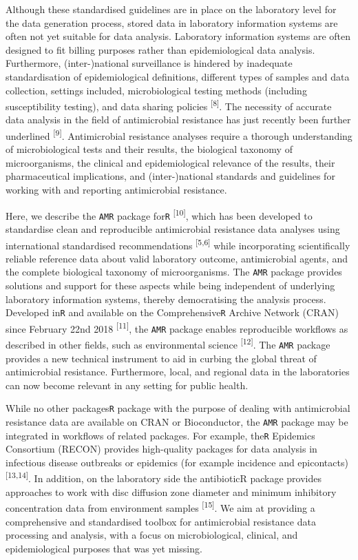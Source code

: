 \documentclass[
]{book}
\begin{document}
Although these standardised guidelines are in place on the laboratory level for the data generation process, stored data in laboratory information systems are often not yet suitable for data analysis. Laboratory information systems are often designed to fit billing purposes rather than epidemiological data analysis. Furthermore, (inter-)national surveillance is hindered by inadequate standardisation of epidemiological definitions, different types of samples and data collection, settings included, microbiological testing methods (including susceptibility testing), and data sharing policies \textsuperscript{{[}8{]}}. The necessity of accurate data analysis in the field of antimicrobial resistance has just recently been further underlined \textsuperscript{{[}9{]}}. Antimicrobial resistance analyses require a thorough understanding of microbiological tests and their results, the biological taxonomy of microorganisms, the clinical and epidemiological relevance of the results, their pharmaceutical implications, and (inter-)national standards and guidelines for working with and reporting antimicrobial resistance.

Here, we describe the \texttt{AMR} package for\texttt{R} \textsuperscript{{[}10{]}}, which has been developed to standardise clean and reproducible antimicrobial resistance data analyses using international standardised recommendations \textsuperscript{{[}5,6{]}} while incorporating scientifically reliable reference data about valid laboratory outcome, antimicrobial agents, and the complete biological taxonomy of microorganisms. The \texttt{AMR} package provides solutions and support for these aspects while being independent of underlying laboratory information systems, thereby democratising the analysis process. Developed in\texttt{R} and available on the Comprehensive\texttt{R} Archive Network (CRAN) since February 22nd 2018 \textsuperscript{{[}11{]}}, the \texttt{AMR} package enables reproducible workflows as described in other fields, such as environmental science \textsuperscript{{[}12{]}}. The \texttt{AMR} package provides a new technical instrument to aid in curbing the global threat of antimicrobial resistance. Furthermore, local, and regional data in the laboratories can now become relevant in any setting for public health.

While no other packages\texttt{R} package with the purpose of dealing with antimicrobial resistance data are available on CRAN or Bioconductor, the \texttt{AMR} package may be integrated in workflows of related packages. For example, the\texttt{R} Epidemics Consortium (RECON) provides high-quality packages for data analysis in infectious disease outbreaks or epidemics (for example incidence and epicontacts) \textsuperscript{{[}13,14{]}}. In addition, on the laboratory side the antibioticR package provides approaches to work with disc diffusion zone diameter and minimum inhibitory concentration data from environment samples \textsuperscript{{[}15{]}}. We aim at providing a comprehensive and standardised toolbox for antimicrobial resistance data processing and analysis, with a focus on microbiological, clinical, and epidemiological purposes that was yet missing.
\end{document}
